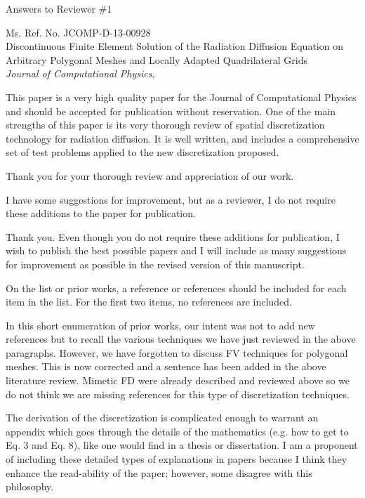 \documentclass{article}
\begin{document}
\begin{center}
{ \Large Answers to Reviewer \#1}
\end{center}

\bigskip

\noindent Ms. Ref. No. JCOMP-D-13-00928\\
Discontinuous Finite Element Solution of the Radiation Diffusion Equation on Arbitrary Polygonal Meshes and Locally Adapted Quadrilateral Grids\\
{\it Journal of Computational Physics},\\

\bigskip
\bigskip

{
\color{blue}
This paper is a very high quality paper for the Journal of Computational Physics and should be
accepted for publication without reservation. One of the main strengths of this paper is its very thorough
review of spatial discretization technology for radiation diffusion. It is well written, and includes a
comprehensive set of test problems applied to the new discretization proposed.
}

Thank you for your thorough review and appreciation of our work. 
\bigskip


{
\color{blue}
I have some suggestions for improvement, but as a reviewer, I do not require these additions to the paper
for publication.
}


Thank you. Even though you do not require these additions for publication, I wish to publish the best 
possible papers and I will include as many suggestions for improvement as possible in the revised version of 
this manuscript.
\bigskip



{
\color{blue}
On the list or prior works, a reference or references should be included for each item in the list. For the
first two items, no references are included.
}

In this short enumeration of prior works, our intent was not to add new references but to recall
the various techniques we have just reviewed in the above paragraphs. However, we have forgotten to 
discuss FV techniques for polygonal meshes. This is now corrected and a sentence has been added in the 
above literature review. Mimetic FD were already described and reviewed above so we do not think we are missing 
references for this type of discretization techniques. 
\bigskip

{
\color{blue}
The derivation of the discretization is complicated enough to warrant an appendix which goes through
the details of the mathematics (e.g. how to get to Eq. 3 and Eq. 8), like one would find in a thesis or
dissertation. I am a proponent of including these detailed types of explanations in papers because I think
they enhance the read-ability of the paper; however, some disagree with this philosophy.
}
\end{document}
